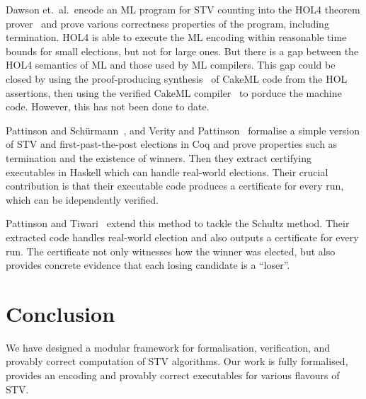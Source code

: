 \documentclass{llncs}
\begin{document}
Dawson et.\ al.\ encode an ML program for STV counting into the HOL4
theorem prover~\cite{DBLP:conf/voteid/DawsonGM15} and prove various
correctness properties of the program, including termination. HOL4 is
able to execute the ML encoding within reasonable time bounds for
small elections, but not for large ones. But there is a gap between
the HOL4 semantics of ML and those used by ML compilers. This gap
could be closed by using the proof-producing synthesis~\cite{Myreen} of CakeML code from the HOL assertions, then using the verified CakeML compiler~\cite{POPL14} to porduce the machine code. However, this
has not been done to date. 

Pattinson and Sch\"urmann~\cite{DBLP:conf/ausai/PattinsonS15}, and
Verity and Pattinson~\cite{DBLP:conf/acsw/VerityP17} formalise a
simple version of STV and first-past-the-post elections in Coq and
prove properties such as termination and the existence of winners.
Then they extract certifying executables in Haskell which can handle
real-world elections. Their crucial contribution is that their
executable code produces a certificate for every run, which can be
idependently verified. 

Pattinson and Tiwari~\cite{DBLP:conf/itp/PattinsonT17} extend this
method to tackle the Schultz method.  Their extracted code handles
real-world election and also outputs a certificate for every run.
The certificate not only witnesses how the winner was elected, but also
provides concrete evidence that each losing candidate is a ``loser''.

\section{Conclusion}
We have designed a modular framework for formalisation, verification, 
and provably correct computation of STV algorithms. Our work
is fully formalised, provides an encoding and provably correct
executables for various flavours of STV. 

%
\end{document}
